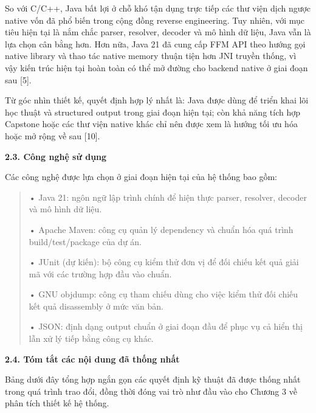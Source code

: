 \documentclass[
]{article}
\begin{document}
So với C/C++, Java bất lợi ở chỗ khó tận dụng trực tiếp các thư viện
dịch ngược native vốn đã phổ biến trong cộng đồng reverse engineering.
Tuy nhiên, với mục tiêu hiện tại là nắm chắc parser, resolver, decoder
và mô hình dữ liệu, Java vẫn là lựa chọn cân bằng hơn. Hơn nữa, Java 21
đã cung cấp FFM API theo hướng gọi native library và thao tác native
memory thuận tiện hơn JNI truyền thống, vì vậy kiến trúc hiện tại hoàn
toàn có thể mở đường cho backend native ở giai đoạn sau {[}5{]}.

Từ góc nhìn thiết kế, quyết định hợp lý nhất là: Java được dùng để triển
khai lõi học thuật và structured output trong giai đoạn hiện tại; còn
khả năng tích hợp Capstone hoặc các thư viện native khác chỉ nên được
xem là hướng tối ưu hóa hoặc mở rộng về sau {[}10{]}.

\textbf{2.3. Công nghệ sử dụng}

Các công nghệ được lựa chọn ở giai đoạn hiện tại của hệ thống bao gồm:

\begin{quote}
• Java 21: ngôn ngữ lập trình chính để hiện thực parser, resolver,
decoder và mô hình dữ liệu.

• Apache Maven: công cụ quản lý dependency và chuẩn hóa quá trình
build/test/package của dự án.

• JUnit (dự kiến): bộ công cụ kiểm thử đơn vị để đối chiếu kết quả giải
mã với các trường hợp đầu vào chuẩn.

• GNU objdump: công cụ tham chiếu dùng cho việc kiểm thử đối chiếu kết
quả disassembly ở mức văn bản.

• JSON: định dạng output chuẩn ở giai đoạn đầu để phục vụ cả hiển thị
lẫn xử lý tiếp bằng công cụ khác.
\end{quote}

\textbf{2.4. Tóm tắt các nội dung đã thống nhất}

Bảng dưới đây tổng hợp ngắn gọn các quyết định kỹ thuật đã được thống
nhất trong quá trình trao đổi, đồng thời đóng vai trò như đầu vào cho
Chương 3 về phân tích thiết kế hệ thống.
\end{document}
